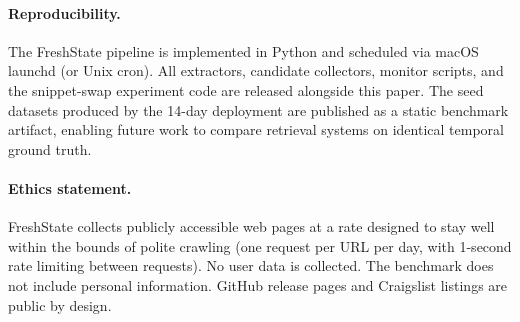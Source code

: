 \paragraph{Reproducibility.}
The FreshState pipeline is implemented in Python and scheduled via macOS launchd
(or Unix cron). All extractors, candidate collectors, monitor scripts, and the
snippet-swap experiment code are released alongside this paper. The seed datasets
produced by the 14-day deployment are published as a static benchmark artifact,
enabling future work to compare retrieval systems on identical temporal ground truth.

\paragraph{Ethics statement.}
FreshState collects publicly accessible web pages at a rate designed to stay well
within the bounds of polite crawling (one request per URL per day, with 1-second
rate limiting between requests). No user data is collected. The benchmark does not
include personal information. GitHub release pages and Craigslist listings are
public by design.
